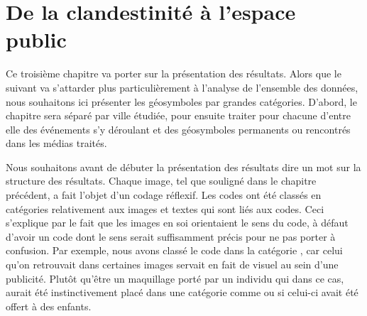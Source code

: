
\chapter{De la clandestinité à l'espace public}
\label{cha:de_la_clandestinite_a_l_espace_public}


Ce troisième chapitre va porter sur la présentation des résultats.
Alors que le suivant va s'attarder plus particulièrement à l'analyse de l'ensemble des données, nous souhaitons ici présenter les géosymboles par grandes catégories.
D'abord, le chapitre sera séparé par ville étudiée, pour ensuite traiter pour chacune d'entre elle des événements s'y déroulant et des géosymboles permanents ou rencontrés dans les médias traités.

Nous souhaitons avant de débuter la présentation des résultats dire un mot sur la structure des résultats.
Chaque image, tel que souligné dans le chapitre précédent, a fait l'objet d'un codage réflexif.
Les codes ont été classés en catégories relativement aux images et textes qui sont liés aux codes.
Ceci s'explique par le fait que les images en soi orientaient le sens du code, à défaut d'avoir un code dont le sens serait suffisamment précis pour ne pas porter à confusion.
Par exemple, nous avons classé le code  dans la catégorie , car celui qu'on retrouvait dans certaines images servait en fait de visuel au sein d'une publicité.
Plutôt qu'être un maquillage porté par un individu qui dans ce cas, aurait été instinctivement placé dans une catégorie comme  ou  si celui-ci avait été offert à des enfants.

